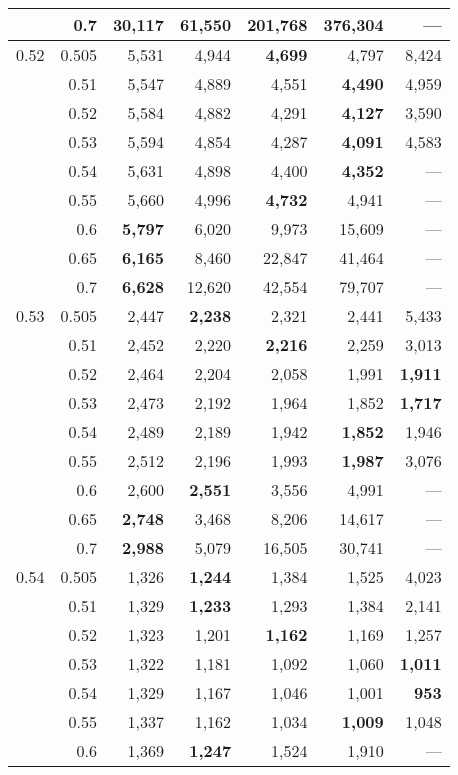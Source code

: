 \documentclass[12pt,runningheads]{llncs}
\begin{document}
{\begin{table}
\begin{tabular}{lr|rrrr|r}
     & 0.7 & \bf{30,117} & 61,550 & 201,768 & 376,304 & --- \\
\hline
0.52 & 0.505 & 5,531 & 4,944 & \bf{4,699} & 4,797 & 8,424 \\
     & 0.51 & 5,547 & 4,889 & 4,551 & \bf{4,490} & 4,959 \\
     & 0.52 & 5,584 & 4,882 & 4,291 & \bf{4,127} & 3,590 \\
     & 0.53 & 5,594 & 4,854 & 4,287 & \bf{4,091} & 4,583 \\
     & 0.54 & 5,631 & 4,898 & 4,400 & \bf{4,352} & --- \\
     & 0.55 & 5,660 & 4,996 & \bf{4,732} & 4,941 & --- \\
     & 0.6 & \bf{5,797} & 6,020 & 9,973 & 15,609 & --- \\
     & 0.65 & \bf{6,165} & 8,460 & 22,847 & 41,464 & --- \\
     & 0.7 & \bf{6,628} & 12,620 & 42,554 & 79,707 & --- \\
\hline
0.53 & 0.505 & 2,447 & \bf{2,238} & 2,321 & 2,441 & 5,433 \\
     & 0.51 & 2,452 & 2,220 & \bf{2,216} & 2,259 & 3,013 \\
     & 0.52 & 2,464 & 2,204 & 2,058 & 1,991 & \bf{1,911} \\
     & 0.53 & 2,473 & 2,192 & 1,964 & 1,852 & \bf{1,717} \\
     & 0.54 & 2,489 & 2,189 & 1,942 & \bf{1,852} & 1,946 \\
     & 0.55 & 2,512 & 2,196 & 1,993 & \bf{1,987} & 3,076 \\
     & 0.6 & 2,600 & \bf{2,551} & 3,556 & 4,991 & --- \\
     & 0.65 & \bf{2,748} & 3,468 & 8,206 & 14,617 & --- \\
     & 0.7 & \bf{2,988} & 5,079 & 16,505 & 30,741 & --- \\
\hline
0.54 & 0.505 & 1,326 & \bf{1,244} & 1,384 & 1,525 & 4,023 \\
     & 0.51 & 1,329 & \bf{1,233} & 1,293 & 1,384 & 2,141 \\
     & 0.52 & 1,323 & 1,201 & \bf{1,162} & 1,169 & 1,257 \\
     & 0.53 & 1,322 & 1,181 & 1,092 & 1,060 & \bf{1,011} \\
     & 0.54 & 1,329 & 1,167 & 1,046 & 1,001 & \bf{953} \\
     & 0.55 & 1,337 & 1,162 & 1,034 & \bf{1,009} & 1,048 \\
     & 0.6 & 1,369 & \bf{1,247} & 1,524 & 1,910 & --- \\

\end{tabular}
\end{table}}
\end{document}
